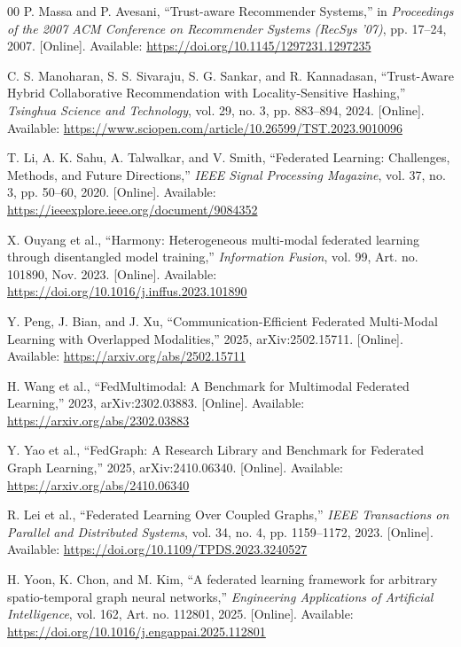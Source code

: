 \documentclass[12pt,a4paper]{report}
\begin{document}
{\begin{thebibliography}{00}
 P. Massa and P. Avesani, ``Trust-aware Recommender Systems,'' in \textit{Proceedings of the 2007 ACM Conference on Recommender Systems (RecSys '07)}, pp. 17--24, 2007. [Online]. Available: \url{https://doi.org/10.1145/1297231.1297235}

 C. S. Manoharan, S. S. Sivaraju, S. G. Sankar, and R. Kannadasan, ``Trust-Aware Hybrid Collaborative Recommendation with Locality-Sensitive Hashing,'' \textit{Tsinghua Science and Technology}, vol. 29, no. 3, pp. 883--894, 2024. [Online]. Available: \url{https://www.sciopen.com/article/10.26599/TST.2023.9010096}

 T. Li, A. K. Sahu, A. Talwalkar, and V. Smith, ``Federated Learning: Challenges, Methods, and Future Directions,'' \textit{IEEE Signal Processing Magazine}, vol. 37, no. 3, pp. 50--60, 2020. [Online]. Available: \url{https://ieeexplore.ieee.org/document/9084352}

 X. Ouyang et al., ``Harmony: Heterogeneous multi-modal federated learning through disentangled model training,'' \textit{Information Fusion}, vol. 99, Art. no. 101890, Nov. 2023. [Online]. Available: \url{https://doi.org/10.1016/j.inffus.2023.101890}

 Y. Peng, J. Bian, and J. Xu, ``Communication-Efficient Federated Multi-Modal Learning with Overlapped Modalities,'' 2025, arXiv:2502.15711. [Online]. Available: \url{https://arxiv.org/abs/2502.15711}

 H. Wang et al., ``{FedMultimodal}: A Benchmark for Multimodal Federated Learning,'' 2023, arXiv:2302.03883. [Online]. Available: \url{https://arxiv.org/abs/2302.03883}

 {Y. Yao et al., ``{FedGraph}: A Research Library and Benchmark for Federated Graph Learning,'' 2025, arXiv:2410.06340. [Online]. Available: \url{https://arxiv.org/abs/2410.06340}}

 R. Lei et al., ``Federated Learning Over Coupled Graphs,'' \textit{IEEE Transactions on Parallel and Distributed Systems}, vol. 34, no. 4, pp. 1159--1172, 2023. [Online]. Available: \url{https://doi.org/10.1109/TPDS.2023.3240527}

 H. Yoon, K. Chon, and M. Kim, ``A federated learning framework for arbitrary spatio-temporal graph neural networks,'' \textit{Engineering Applications of Artificial Intelligence}, vol. 162, Art. no. 112801, 2025. [Online]. Available: \url{https://doi.org/10.1016/j.engappai.2025.112801}


\end{thebibliography}}
\end{document}
